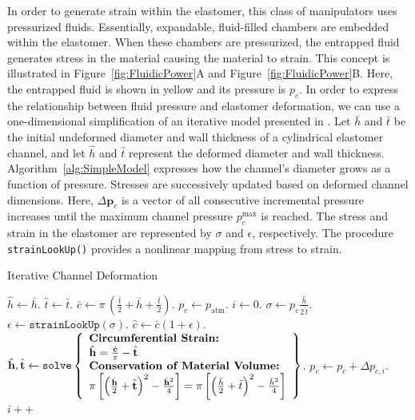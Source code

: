 In order to generate strain within the elastomer, this class of manipulators uses pressurized fluids.
Essentially, expandable, fluid-filled chambers are embedded within the elastomer.
When these chambers are pressurized, the entrapped fluid generates stress in the material causing the material to strain.
This concept is illustrated in Figure~\ref{fig:FluidicPower}A and Figure~\ref{fig:FluidicPower}B.
Here, the entrapped fluid is shown in yellow and its pressure is $p_c$.
In order to express the relationship between fluid pressure and elastomer deformation, we can use a one-dimensional simplification of an iterative model presented in \citet{marchese2015design}.
Let $\bar{h}$ and $\bar{t}$ be the initial undeformed diameter and wall thickness of a cylindrical elastomer channel, and let $\hat{h}$ and $\hat{t}$ represent the deformed diameter and wall thickness.
Algorithm~\ref{alg:SimpleModel} expresses how the channel's diameter grows as a function of pressure.
Stresses are successively updated based on deformed channel dimensions.
Here, $\Delta \mathbf{p}_{c}$ is a vector of all consecutive incremental pressure increases until the maximum channel pressure $p_c^{\text{max}}$ is reached.
The stress and strain in the elastomer are represented by $\sigma$ and $\epsilon$, respectively.
The procedure \texttt{strainLookUp()} provides a nonlinear mapping from stress to strain.
\begin{algorithm}[htb]
\footnotesize
  \DontPrintSemicolon
  \SetAlgoLined
  \caption{Iterative Channel Deformation}
  \label{alg:SimpleModel}
  $\hat{h} \gets \bar{h}$. \;
  $\hat{t} \gets \bar{t}$. \;
  $\bar{c} \gets \pi \, \left(\frac{\bar{t}}{2} + \bar{h} + \frac{\bar{t}}{2}\right)$. \;
  $p_c \gets p_{\text{atm}}$. \;
  $i \gets 0$. \;
  {
     $\sigma \gets p_c \frac{\hat{h}}{2 \,\hat{t}}$. \;
     $\epsilon \gets \texttt{strainLookUp}(\sigma)$. \;
     $\hat{c} \gets \bar{c}\left( 1 + \epsilon \right)$. \;
     $\hat{h}, \hat{t} \gets \texttt{solve}\left\{
	\begin{array}{l}
       \text{\textbf{Circumferential Strain:}} \\
       \hat{h} = \frac{\hat{c}}{\pi} - \hat{t} \\
       \text{\textbf{Conservation of Material Volume:}} \\
       \pi \left[ \left( \frac{\hat{h}}{2} + \hat{t}\right)^2 - \frac{\hat{h}^2}{4} \right]= \pi \left[\left( \frac{\bar{h}}{2} + \bar{t}\right)^2 - \frac{\bar{h}^2}{4}\right]
     \end{array}
     \right\} $. \;
     $p_c \gets p_c + \Delta p_{c,i}$. \;
     $i++$
   }
\normalsize
\end{algorithm}

